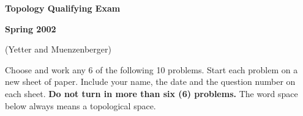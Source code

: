 



\setlength{\textwidth}{16.5cm}
\setlength{\oddsidemargin}{0cm}
\setlength{\topmargin}{-1.4cm}
\setlength{\textheight}{23cm}





\newtheorem{thm}{Theorem}
\newtheorem{defin}[thm]{Definition}
\newtheorem{lemma}[thm]{Lemma}
\newtheorem{propo}[thm]{Proposition}
\newtheorem{cor}[thm]{Corollary}
\newtheorem{conj}[thm]{Conjecture}
\newtheorem{exa}[thm]{Example}

\centerline{\LARGE \bf Topology Qualifying Exam}

\centerline{\large \bf Spring 2002}

\centerline{\large (Yetter and Muenzenberger)}
\medskip

\noindent Choose and work any 6 of the following 10 problems.  Start each
problem on a new sheet of paper.  Include your name, the date and the question
number on each sheet. {\bf Do not turn in more than six (6) problems.}  
The word space below always means a topological space.
\medskip


